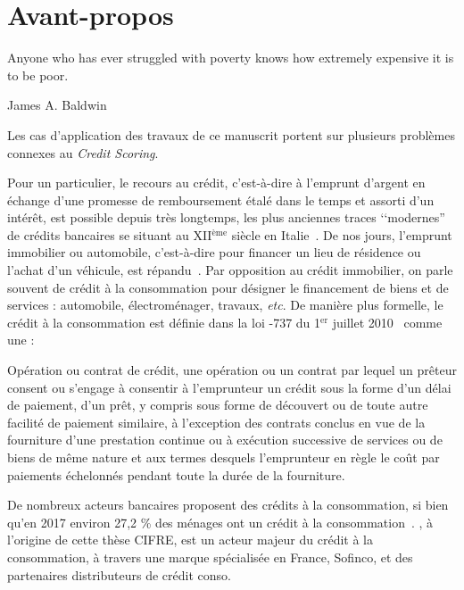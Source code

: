 \chapter*{\nmu Avant-propos} \label{chap_intro}

\epigraph{Anyone who has ever struggled with poverty knows how extremely expensive it is to be poor.}{James A. Baldwin}

Les cas d'application des travaux de ce manuscrit portent sur plusieurs problèmes connexes au \textit{Credit Scoring}.

Pour un particulier, le recours au crédit, c'est-à-dire à l'emprunt d'argent en échange d'une promesse de remboursement étalé dans le temps et assorti d'un intérêt, est possible depuis très longtemps, les plus anciennes traces ‘‘modernes'' de crédits bancaires se situant au XII$^\text{ème}$ siècle en Italie~\cite{thomas_wards_1828}. De nos jours, l'emprunt immobilier ou automobile, c'est-à-dire pour financer un lieu de résidence ou l'achat d'un véhicule, est répandu~\cite{la_tribune_2010}. Par opposition au crédit immobilier, on parle souvent de crédit à la consommation pour désigner le financement de biens et de services : automobile, électroménager, travaux, \textit{etc}. De manière plus formelle, le crédit à la consommation est définie dans la loi -737 du 1$^\text{er}$ juillet 2010~\cite{noauthor_loi_2010} comme une :
\begin{displayquote}
Opération ou contrat de crédit, une opération ou un contrat par lequel un prêteur consent ou s’engage à consentir à l’emprunteur un crédit sous la forme d’un délai de paiement, d’un prêt, y compris sous forme de découvert ou de toute autre facilité de paiement similaire, à l’exception des contrats conclus en vue de la fourniture d’une prestation continue ou à exécution successive de services ou de biens de même nature et aux termes desquels l’emprunteur en règle le coût par paiements échelonnés pendant toute la durée de la fourniture.
\end{displayquote}

De nombreux acteurs bancaires proposent des crédits à la consommation, si bien qu'en 2017 environ 27,2 \% des ménages ont un crédit à la consommation~\cite{observatoire}. , à l'origine de cette thèse CIFRE, est un acteur majeur du crédit à la consommation, à travers une marque spécialisée en France, Sofinco, et des partenaires distributeurs de crédit conso.

